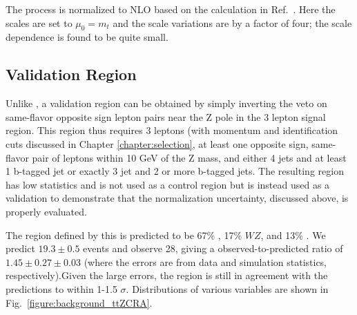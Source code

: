 The \tZ process is normalized to NLO based on the calculation in Ref.~\cite{Campbell:2013yla}.  Here the scales are set to $\mu_0 = m_t$ and the scale variations are by a factor of four; the scale dependence is found to be quite small.


\subsection{\ttZ Validation Region}

Unlike \ttW, a \ttZ validation region can be obtained by simply inverting the veto on same-flavor opposite sign lepton pairs near the Z pole in the 3 lepton signal region. This region thus requires 3 leptons (with momentum and identification cuts discussed in Chapter \ref{chapter:selection}, at least one opposite sign, same-flavor pair of leptons within 10 GeV of the Z mass, and either 4 jets and at least 1 b-tagged jet or exactly 3 jet and 2 or more b-tagged jets. The resulting region has low statistics and is not used as a control region but is instead used as a validation to demonstrate that the normalization uncertainty, discussed above, is properly evaluated. 

The region defined by this is predicted to be 67\% \ttZ, 17\% $WZ$, and 13\% \tZ.  We predict $19.3 \pm 0.5$ events and observe 28, giving a observed-to-predicted ratio of $1.45 \pm 0.27 \pm 0.03$ (where the errors are from data and simulation statistics, respectively).Given the large errors, the region is still in agreement with the predictions to within 1-1.5 $\sigma$.  Distributions of various variables are shown in Fig.~\ref{figure:background_ttZCRA}.  

